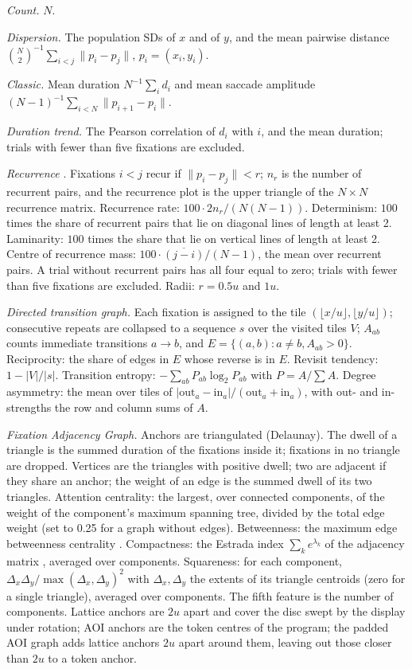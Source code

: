 \documentclass[10pt]{article}
\begin{document}
\emph{Count.} $N$.

\emph{Dispersion.} The population SDs of $x$ and of $y$, and the mean pairwise distance $\binom{N}{2}^{-1} \sum_{i<j} \lVert p_i - p_j \rVert$, $p_i = (x_i, y_i)$.

\emph{Classic.} Mean duration $N^{-1} \sum_i d_i$ and mean saccade amplitude $(N - 1)^{-1} \sum_{i<N} \lVert p_{i+1} - p_i \rVert$.

\emph{Duration trend.} The Pearson correlation of $d_i$ with $i$, and the mean duration; trials with fewer than five fixations are excluded.

\emph{Recurrence} \citep{anderson2013recurrence}. Fixations $i < j$ recur if $\lVert p_i - p_j \rVert < r$; $n_r$ is the number of recurrent pairs, and the recurrence plot is the upper triangle of the $N \times N$ recurrence matrix. Recurrence rate: $100 \cdot 2 n_r / (N(N-1))$. Determinism: $100$ times the share of recurrent pairs that lie on diagonal lines of length at least 2. Laminarity: $100$ times the share that lie on vertical lines of length at least 2. Centre of recurrence mass: $100 \cdot \overline{(j - i)} / (N - 1)$, the mean over recurrent pairs. A trial without recurrent pairs has all four equal to zero; trials with fewer than five fixations are excluded. Radii: $r = 0.5u$ and $1u$.

\emph{Directed transition graph.} Each fixation is assigned to the tile $(\lfloor x/u \rfloor, \lfloor y/u \rfloor)$; consecutive repeats are collapsed to a sequence $s$ over the visited tiles $V$; $A_{ab}$ counts immediate transitions $a \to b$, and $E = \{(a, b): a \neq b, A_{ab} > 0\}$. Reciprocity: the share of edges in $E$ whose reverse is in $E$. Revisit tendency: $1 - |V|/|s|$. Transition entropy: $-\sum_{ab} P_{ab} \log_2 P_{ab}$ with $P = A / \sum A$. Degree asymmetry: the mean over tiles of $|\mathrm{out}_a - \mathrm{in}_a| / (\mathrm{out}_a + \mathrm{in}_a)$, with out- and in-strengths the row and column sums of $A$.

\emph{Fixation Adjacency Graph.} Anchors are triangulated (Delaunay). The dwell of a triangle is the summed duration of the fixations inside it; fixations in no triangle are dropped. Vertices are the triangles with positive dwell; two are adjacent if they share an anchor; the weight of an edge is the summed dwell of its two triangles. Attention centrality: the largest, over connected components, of the weight of the component's maximum spanning tree, divided by the total edge weight (set to 0.25 for a graph without edges). Betweenness: the maximum edge betweenness centrality \citep{brandes2001faster}. Compactness: the Estrada index $\sum_k e^{\lambda_k}$ of the adjacency matrix \citep{estrada2000characterization}, averaged over components. Squareness: for each component, $\Delta_x \Delta_y / \max(\Delta_x, \Delta_y)^2$ with $\Delta_x, \Delta_y$ the extents of its triangle centroids (zero for a single triangle), averaged over components. The fifth feature is the number of components. Lattice anchors are $2u$ apart and cover the disc swept by the display under rotation; AOI anchors are the token centres of the program; the padded AOI graph adds lattice anchors $2u$ apart around them, leaving out those closer than $2u$ to a token anchor.
\end{document}
